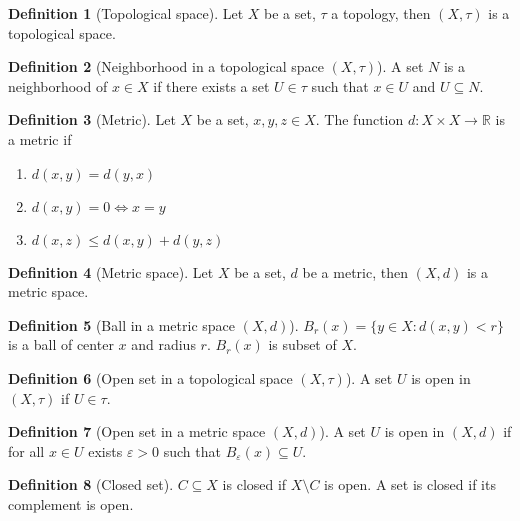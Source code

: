 \documentclass{article}
\newcommand{\ar}{\rightarrow}
\newenvironment{enumrom}{\begin{enumerate}[label=(\roman*)]}{\end{enumerate}}
\theoremstyle{definition}
\newtheorem{definition}{Definition}[section]
\theoremstyle{definition}
\theoremstyle{plain}
\theoremstyle{plain}
\theoremstyle{plain}
\theoremstyle{plain}
\theoremstyle{definition}
\theoremstyle{remark}
\theoremstyle{remark}
\theoremstyle{remark}
\theoremstyle{remark}
\newcommand{\R}{\mathbb{R}}
\newcommand{\E}{\varepsilon}
\begin{document}
\begin{definition}[Topological space]
  Let $X$ be a set, $\tau$ a topology, then $(X, \tau)$ is a topological space.
\end{definition}


\begin{definition}[Neighborhood in a topological space $(X, \tau)$]
  A set $N$ is a neighborhood of $x \in X$ if there exists a set $U \in \tau$ such that $x \in U$ and $U \subseteq N$.
\end{definition}


\begin{definition}[Metric]
  Let $X$ be a set, $x, y, z \in X$. The function $d : X \times X \ar \R$ is a metric if
  \begin{enumrom}
  \item $d(x,y) = d(y,x)$
  \item $d(x,y) = 0 \iff x = y$
  \item $d(x,z) \leq d(x,y) + d(y,z)$
  \end{enumrom}
\end{definition}




\begin{definition}[Metric space]
  Let $X$ be a set, $d$ be a metric, then $(X, d)$ is a metric space.
\end{definition}


\begin{definition}[Ball in a metric space $(X, d)$]
  $B_r(x) = \{ y \in X : d(x,y) < r \}$ is a ball of center $x$ and radius $r$. $B_r(x)$ is subset of $X$.
\end{definition}


\begin{definition}[Open set in a topological space $(X, \tau)$]
  A set $U$ is open in $(X, \tau)$ if $U \in \tau$.
\end{definition}


\begin{definition}[Open set in a metric space $(X, d)$]
  A set $U$ is open in $(X, d)$ if for all $x \in U$ exists $\E > 0$ such that $B_\E(x) \subseteq U$.
\end{definition}


\begin{definition}[Closed set]
  $C \subseteq X$ is closed if $X\setminus C$ is open. A set is closed if its complement is open.
\end{definition}
\end{document}
